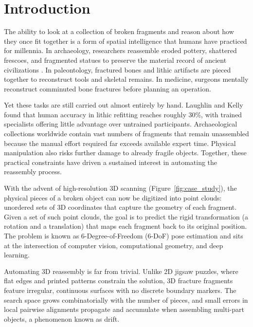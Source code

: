 \chapter{Introduction}
\label{chap:ch1}

The ability to look at a collection of broken fragments and reason about how they once fit together is a form of spatial intelligence that humans have practiced for millennia. In archaeology, researchers reassemble eroded pottery, shattered frescoes, and fragmented statues to preserve the material record of ancient civilizations \cite{huang2006reassembling, toler2010multi, funkhouser2011learning}. In paleontology, fractured bones and lithic artifacts are pieced together to reconstruct tools and skeletal remains. In medicine, surgeons mentally reconstruct comminuted bone fractures before planning an operation.

Yet these tasks are still carried out almost entirely by hand. Laughlin and Kelly \cite{laughlin2010lithic} found that human accuracy in lithic refitting reaches roughly 30\%, with trained specialists offering little advantage over untrained participants. Archaeological collections worldwide contain vast numbers of fragments that remain unassembled because the manual effort required far exceeds available expert time. Physical manipulation also risks further damage to already fragile objects. Together, these practical constraints have driven a sustained interest in automating the reassembly process.

With the advent of high-resolution 3D scanning (Figure~\ref{fig:case_study}), the physical pieces of a broken object can now be digitized into point clouds: unordered sets of 3D coordinates that capture the geometry of each fragment. Given a set of such point clouds, the goal is to predict the rigid transformation (a rotation and a translation) that maps each fragment back to its original position. The problem is known as 6-Degree-of-Freedom (6-DoF) pose estimation and sits at the intersection of computer vision, computational geometry, and deep learning.

Automating 3D reassembly is far from trivial. Unlike 2D jigsaw puzzles, where flat edges and printed patterns constrain the solution, 3D fracture fragments feature irregular, continuous surfaces with no discrete boundary markers. The search space grows combinatorially with the number of pieces, and small errors in local pairwise alignments propagate and accumulate when assembling multi-part objects, a phenomenon known as drift.

